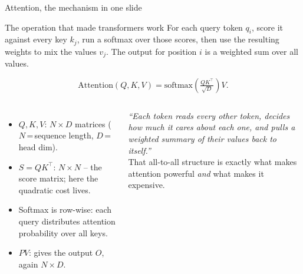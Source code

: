 \documentclass[10pt,aspectratio=169]{beamer}
\begin{document}
\begin{frame}{Attention, the mechanism in one slide}
  \begin{block}{The operation that made transformers work}
    For each query token $q_i$, score it against every key $k_j$, run
    a softmax over those scores, then use the resulting weights to mix
    the values $v_j$. The output for position $i$ is a weighted sum
    over all values.
  \end{block}
  \[
    \mathrm{Attention}(Q, K, V) =
    \mathrm{softmax}\!\left(\tfrac{Q K^\top}{\sqrt{D}}\right) V.
  \]
  \begin{columns}[T]
      \begin{itemize}
        \item $Q, K, V$: $N \times D$ matrices ($N$\,=\,sequence length,
              $D$\,=\,head dim).
        \item $S = Q K^\top$: $N \times N$ -- the score matrix; here
              the quadratic cost lives.
        \item Softmax is row-wise: each query distributes attention
              probability over all keys.
        \item $P V$: gives the output $O$, again $N \times D$.
      \end{itemize}
      \begin{aha}
        \emph{``Each token reads every other token, decides how much
        it cares about each one, and pulls a weighted summary of
        their values back to itself.''}\\[4pt]
        That all-to-all structure is exactly what makes attention
        powerful \emph{and} what makes it expensive.
      \end{aha}
  \end{columns}
\end{frame}
\end{document}
